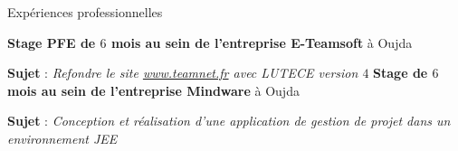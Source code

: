\begin{rubric}{Expériences professionnelles}

%
	\textbf{Stage PFE de $6$ mois au sein de l’entreprise E-Teamsoft} à Oujda
	\par \textbf{Sujet} : \emph{Refondre le site \url{www.teamnet.fr} avec LUTECE version $4$}
%
%
	\textbf{Stage de $6$ mois au sein de l’entreprise Mindware} à Oujda
	\par \textbf{Sujet} : \emph{Conception et réalisation d'une application de gestion de projet dans un environnement JEE}
%
%
\end{rubric}
